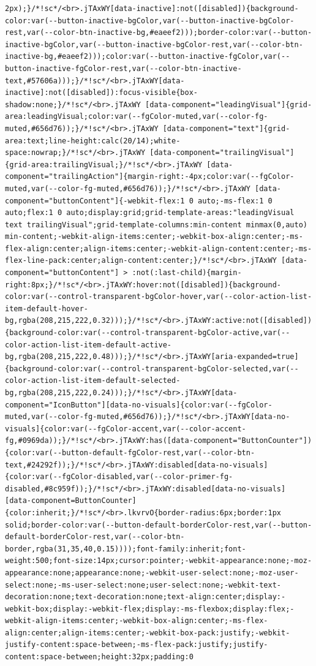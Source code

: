 \documentclass[
  letterpaper,
]{book}
\begin{document}
\begin{verbatim}
2px);}/*!sc*/<br>.jTAxWY[data-inactive]:not([disabled]){background-color:var(--button-inactive-bgColor,var(--button-inactive-bgColor-rest,var(--color-btn-inactive-bg,#eaeef2)));border-color:var(--button-inactive-bgColor,var(--button-inactive-bgColor-rest,var(--color-btn-inactive-bg,#eaeef2)));color:var(--button-inactive-fgColor,var(--button-inactive-fgColor-rest,var(--color-btn-inactive-text,#57606a)));}/*!sc*/<br>.jTAxWY[data-inactive]:not([disabled]):focus-visible{box-shadow:none;}/*!sc*/<br>.jTAxWY [data-component="leadingVisual"]{grid-area:leadingVisual;color:var(--fgColor-muted,var(--color-fg-muted,#656d76));}/*!sc*/<br>.jTAxWY [data-component="text"]{grid-area:text;line-height:calc(20/14);white-space:nowrap;}/*!sc*/<br>.jTAxWY [data-component="trailingVisual"]{grid-area:trailingVisual;}/*!sc*/<br>.jTAxWY [data-component="trailingAction"]{margin-right:-4px;color:var(--fgColor-muted,var(--color-fg-muted,#656d76));}/*!sc*/<br>.jTAxWY [data-component="buttonContent"]{-webkit-flex:1 0 auto;-ms-flex:1 0 auto;flex:1 0 auto;display:grid;grid-template-areas:"leadingVisual text trailingVisual";grid-template-columns:min-content minmax(0,auto) min-content;-webkit-align-items:center;-webkit-box-align:center;-ms-flex-align:center;align-items:center;-webkit-align-content:center;-ms-flex-line-pack:center;align-content:center;}/*!sc*/<br>.jTAxWY [data-component="buttonContent"] > :not(:last-child){margin-right:8px;}/*!sc*/<br>.jTAxWY:hover:not([disabled]){background-color:var(--control-transparent-bgColor-hover,var(--color-action-list-item-default-hover-bg,rgba(208,215,222,0.32)));}/*!sc*/<br>.jTAxWY:active:not([disabled]){background-color:var(--control-transparent-bgColor-active,var(--color-action-list-item-default-active-bg,rgba(208,215,222,0.48)));}/*!sc*/<br>.jTAxWY[aria-expanded=true]{background-color:var(--control-transparent-bgColor-selected,var(--color-action-list-item-default-selected-bg,rgba(208,215,222,0.24)));}/*!sc*/<br>.jTAxWY[data-component="IconButton"][data-no-visuals]{color:var(--fgColor-muted,var(--color-fg-muted,#656d76));}/*!sc*/<br>.jTAxWY[data-no-visuals]{color:var(--fgColor-accent,var(--color-accent-fg,#0969da));}/*!sc*/<br>.jTAxWY:has([data-component="ButtonCounter"]){color:var(--button-default-fgColor-rest,var(--color-btn-text,#24292f));}/*!sc*/<br>.jTAxWY:disabled[data-no-visuals]{color:var(--fgColor-disabled,var(--color-primer-fg-disabled,#8c959f));}/*!sc*/<br>.jTAxWY:disabled[data-no-visuals] [data-component=ButtonCounter]{color:inherit;}/*!sc*/<br>.lkvrvO{border-radius:6px;border:1px solid;border-color:var(--button-default-borderColor-rest,var(--button-default-borderColor-rest,var(--color-btn-border,rgba(31,35,40,0.15))));font-family:inherit;font-weight:500;font-size:14px;cursor:pointer;-webkit-appearance:none;-moz-appearance:none;appearance:none;-webkit-user-select:none;-moz-user-select:none;-ms-user-select:none;user-select:none;-webkit-text-decoration:none;text-decoration:none;text-align:center;display:-webkit-box;display:-webkit-flex;display:-ms-flexbox;display:flex;-webkit-align-items:center;-webkit-box-align:center;-ms-flex-align:center;align-items:center;-webkit-box-pack:justify;-webkit-justify-content:space-between;-ms-flex-pack:justify;justify-content:space-between;height:32px;padding:0 
\end{verbatim}
\end{document}
